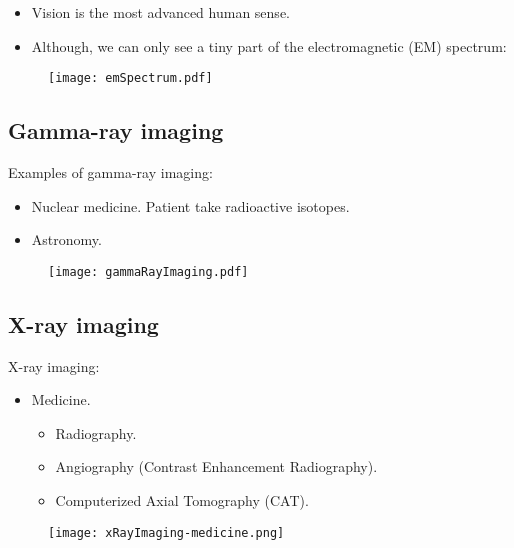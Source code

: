 
\begin{frame}
\begin{itemize}
\item Vision is the most advanced human sense.
\item Although, we can only see a tiny part of the electromagnetic (EM) spectrum:
\end{itemize}
\begin{figure}
\texttt{[image: emSpectrum.pdf]}
\end{figure}
\end{frame}



\subsection*{Gamma-ray imaging}


\begin{frame}
Examples of gamma-ray imaging:
\begin{itemize}
\item Nuclear medicine. Patient take radioactive isotopes.
\item Astronomy.
\end{itemize}
\begin{figure}
\texttt{[image: gammaRayImaging.pdf]}
\end{figure}
\end{frame}


\subsection*{X-ray imaging}


\begin{frame}
X-ray imaging:
\begin{itemize}
\item Medicine.
\begin{itemize}
\item Radiography.
\item Angiography (Contrast Enhancement Radiography).
\item Computerized Axial Tomography (CAT).
\end{itemize}
\end{itemize}
\begin{figure}
\texttt{[image: xRayImaging-medicine.png]}
\end{figure}
\end{frame}

